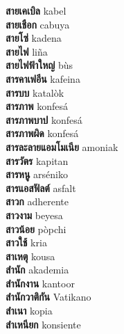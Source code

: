 \textbf{ สายเคเบิล  } kabel \\
\textbf{ สายเชือก  } cabuya \\
\textbf{ สายโซ่  } kadena \\
\textbf{ สายไฟ  } liña \\
\textbf{ สายไฟฟ้าใหญ่  } bùs \\
\textbf{ สารคาเฟอีน  } kafeina \\
\textbf{ สารบบ  } katalòk \\
\textbf{ สารภาพ  } konfesá \\
\textbf{ สารภาพบาป  } konfesá \\
\textbf{ สารภาพผิด  } konfesá \\
\textbf{ สารละลายแอมโมเนีย  } amoniak \\
\textbf{ สารวัตร  } kapitan \\
\textbf{ สารหนู  } arséniko \\
\textbf{ สารแอสฟัลต์  } asfalt \\
\textbf{ สาวก  } adherente \\
\textbf{ สาวงาม  } beyesa \\
\textbf{ สาวน้อย  } pòpchi \\
\textbf{ สาวใช้  } kria \\
\textbf{ สาเหตุ  } kousa \\
\textbf{ สำนัก  } akademia \\
\textbf{ สำนักงาน  } kantoor \\
\textbf{ สำนักวาติกัน  } Vatikano \\
\textbf{ สำเนา  } kopia \\
\textbf{ สำเหนียก  } konsiente \\
